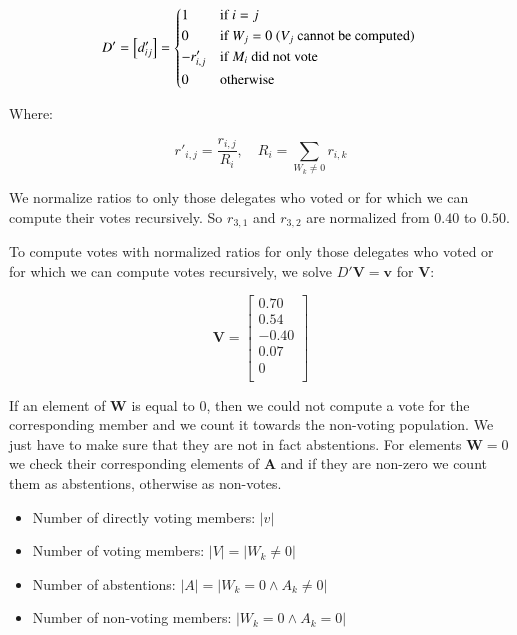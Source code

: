 \documentclass{sigchi}
\begin{document}
\begin{displaymath}
D' = \left[d'_{ij}\right] = \begin{dcases*}
 1 & if $i = j$ \\
 0 & if $W_j = 0$ ($V_j$ cannot be computed) \\
 -r'_{i,j} & if $M_i$ did not vote \\
 0 & otherwise \\
\end{dcases*}
\end{displaymath}

Where:

\begin{displaymath}
r'_{i,j} = \frac{r_{i,j}}{R_i},\quad R_i = \sum_{W_k \ne 0} r_{i,k}
\end{displaymath}

We normalize ratios to only those delegates who voted or for which we can
compute their votes recursively.
So $r_{3,1}$ and $r_{3,2}$ are normalized from $0.40$ to $0.50$.

To compute votes with normalized ratios for only those delegates who voted or for which we can compute votes recursively,
we solve $D' \boldsymbol{V} = \boldsymbol{v}$ for $\boldsymbol{V}$:

\begin{displaymath}
\mathbf{V} = \left[ \begin{array}{c}
0.70 \\
0.54 \\
-0.40 \\
0.07 \\
0 \\
\end{array} \right]
\end{displaymath}

If an element of $\boldsymbol{W}$ is equal to $0$, then we could not compute a vote for the corresponding
member and we count it towards the non-voting population.
We just have to make sure that they are not in fact abstentions.
For elements $\boldsymbol{W} = 0$ we check their corresponding elements of $\boldsymbol{A}$ and if they are
non-zero we count them as abstentions, otherwise as non-votes.

\begin{itemize}
\item Number of directly voting members: $\left| v \right|$
\item Number of voting members: $\left| V \right| = \left| W_k \ne 0 \right|$
\item Number of abstentions: $\left| A \right| = \left| W_k = 0 \land A_k \ne 0 \right|$
\item Number of non-voting members: $\left| W_k = 0 \land A_k = 0 \right|$
\end{itemize}
\end{document}
